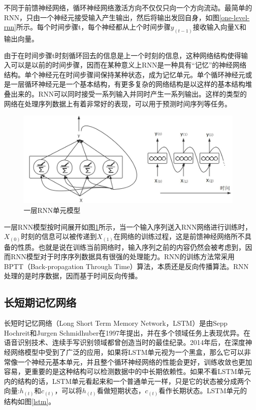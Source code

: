 \documentclass[winfonts,master,oneside,nobackinfo]{njuthesis}
\begin{document}
不同于前馈神经网络，循环神经网络激活方向不仅仅只向一个方向流动。最简单的RNN，只由一个神经元接受输入产生输出，然后将输出发回自身，如图\ref{one-level-rnn}所示。每个时间步骤t，每个神经都从上个时间步骤$y _ { ( t - 1 ) }$接收输入向量X和输出向量。

由于在时间步骤t时刻循环回去的信息是上一个时刻的信息，这种网络结构使得输入可以是以前的时间步骤，因而在某种意义上RNN是一种具有“记忆”的神经网络结构。单个神经元在时间步骤间保持某种状态，成为记忆单元。单个循环神经元或是一层循环神经元是一个基本结构，有更多复杂的网络结构是以这样的基本结构堆叠出来的。RNN可以同时接受一系列输入并同时产生一系列输出。这样的类型的网络在处理序列数据上有着非常好的表现，可以用于预测时间序列等任务。

\begin{figure}[h]
\centering
\includegraphics[width=1\textwidth]{./figure/一层RNN.jpg}
\caption{一层RNN单元模型}
\label{a-layer-rnn}
\end{figure}

一层RNN模型按时间展开如图\ref{a-layer-rnn}所示，当一个输入序列送入RNN网络进行训练时，$X_{(0)}$时刻的信息可以被传递到$X_{(1)}$在网络的训练过程，这是前馈神经网络所不具备的性质。也就是说在训练当前网络时，输入序列之前的内容仍然会被考虑到，因而RNN模型对于时序序列数据具有很强的处理能力。RNN的训练方法常采用BPTT（Back-propagation Through Time）算法，本质还是反向传播算法。RNN处理的是时序数据，因而基于时间反向传播。

\subsection{长短期记忆网络}

长短时记忆网络（Long Short Term Memory Network，LSTM）是由Sepp Hochreit和Jurgen Schmidhuber\cite{Hochreit}在1997年提出，并在多个领域任务上表现优异。在语音识别技术、连续手写识别领域都曾创造当时的最佳纪录。2014年后，在深度神经网络模型中受到了广泛的应用，如果将LSTM单元视为一个黑盒，那么它可以非常像一个神经元基本单元，并且整个循环神经网络的性能会更好，训练收敛也更加容易，更重要的是这种结构可以检测数据中的中长期依赖性。如果不看LSTM单元内的结构的话，LSTM单元看起来和一个普通单元一样，只是它的状态被分成两个向量:${ h } _ { ( t ) }$和$ { c } _ { ( t ) }$，可以将${ h } _ { ( t ) }$看做短期状态，${ c } _ { ( t ) }$看作长期状态。LSTM单元的结构如图\ref{lstm}。
\end{document}
